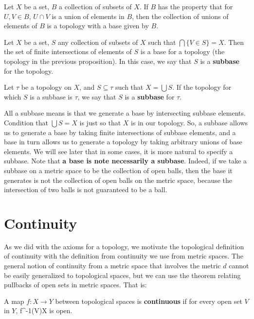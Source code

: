 	\begin{prop}
		Let $X$ be a set, $B$ a collection of subsets of $X$. If $B$ has the property that for $U, V\in B$, $U\cap V$ is a union of elements in $B$, then the collection of unions of elements of $B$ is a topology with a base given by $B$. 
	\end{prop}
	
	\begin{prop}
		Let $X$ be a set, $S$ any collection of subsets of $X$ such that $\bigcap\{V\in S\} = X$. Then the set of finite intersections of elements of $S$ is a base for a topology (the topology in the previous proposition). In this case, we say that $S$ is a \textbf{subbase} for the topology.
	\end{prop}
	
	\begin{definition}[Subbase]
		Let $\tau$ be a topology on $X$, and $S\subseteq\tau$ such that $X = \bigcup S$. If the topology for which $S$ is a subbase is $\tau$, we say that 
		$S$ is a \textbf{subbase} for $\tau$. 
	\end{definition}
	
	All a subbase means is that we generate a base by intersecting subbase elements. Condition that $\bigcup S = X$ is just so that $X$ is in our topology. 
	So, a subbase allows us to generate a base by taking finite intersections of subbase elements, and a base in turn allows us to generate a topology by taking 
	arbitrary unions of base elements. We will see later that in some cases, it is more natural to specify a subbase. Note that \textbf{a base is note necessarily 
	a subbase}. Indeed, if we take a subbase on a metric space to be the collection of open balls, then the base it generates is not the collection of open balls 
	on the metric space, because the intersection of two balls is not guaranteed to be a ball.

\section{Continuity}

	As we did with the axioms for a topology, we motivate the topological definition of continuity with the definition from continuity we use from metric spaces. 
	The general notion of continuity from a metric space that involves the metric $d$ cannot be easily generalized to topological spaces, but we can use the 
	theorem relating pullbacks of open sets in metric spaces. That is:
	
	\begin{definition}[Continuity]
		A map $f : X\rightarrow Y$ between topological spaces is \textbf{continuous} if for every open set $V$ in $Y$, 
		\eq
			f^{-1}(V)\subseteq X
		\qe
		is open. 
	\end{definition}
	
